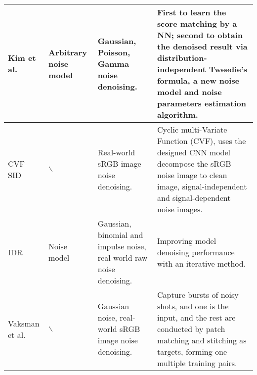 \documentclass[conference]{IEEEtran}
\begin{document}
\begin{table*}[t]
\begin{tabular}{|m{2.2cm}<{\raggedright}|m{2cm}<{\raggedright}|m{4cm}<{\raggedright}|m{7.5cm}<{\raggedright}|}
		\hline
		Kim et al. \cite{kim2022noise}&	Arbitrary noise model&	Gaussian, Poisson, Gamma noise denoising.&	First to learn the score matching by a NN; second to obtain the denoised result via distribution-independent Tweedie’s formula, a new noise model and noise parameters estimation algorithm.\\
		\hline
		CVF-SID \cite{neshatavar2022cvf}&	$\backslash$ &	Real-world sRGB image noise denoising.&	Cyclic multi-Variate Function (CVF), uses the designed CNN model decompose the sRGB noise image to clean image, signal-independent and signal-dependent noise images.\\
		\hline
		IDR \cite{zhang2022idr}&	Noise model	&Gaussian, binomial and impulse noise, real-world raw noise denoising.&	Improving model denoising performance with an iterative method.\\
		\hline
		Vaksman et al. \cite{vaksman2023patch}&	$\backslash$ &	Gaussian noise, real-world sRGB image noise denoising.&	Capture bursts of noisy shots, and one is the input, and the rest are conducted by patch matching and stitching as targets, forming one-multiple training pairs.\\
		\hline
	\end{tabular}
	\label{tab:general}
\vspace{-2em}
\end{table*}
\end{document}
